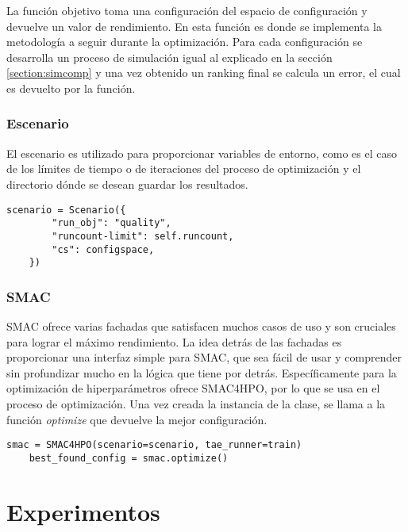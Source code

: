 La función objetivo toma una configuración del espacio de configuración y devuelve un valor de rendimiento. En esta función es donde se implementa la metodología a seguir durante la optimización. Para cada configuración se desarrolla un proceso de simulación igual al explicado en la sección \ref{section:simcomp} y una vez obtenido un ranking final se calcula un error, el cual es devuelto por la función.

\subsubsection*{Escenario}

El escenario es utilizado para proporcionar variables de entorno, como es el caso de los límites de tiempo o de iteraciones del proceso de optimización y el directorio dónde se desean guardar los resultados.

\begin{lstlisting}[caption= Definición del escenario de optimización, label = code:scenario]
    scenario = Scenario({
        "run_obj": "quality",  
        "runcount-limit": self.runcount,
        "cs": configspace,
    })
\end{lstlisting}

\subsubsection*{SMAC}

SMAC ofrece varias fachadas que satisfacen muchos casos de uso y son cruciales para lograr el máximo rendimiento. La idea detrás de las fachadas es proporcionar una interfaz simple para SMAC, que sea fácil de usar y comprender sin profundizar mucho en la lógica que tiene por detrás. Específicamente para la optimización de hiperparámetros ofrece SMAC4HPO, por lo que se usa en el proceso de optimización. Una vez creada la instancia de la clase, se llama a la función \textit{optimize} que devuelve la mejor configuración.

\begin{lstlisting}[caption= Instancia de la clase SMAC4HPO, label = code:smac]
    smac = SMAC4HPO(scenario=scenario, tae_runner=train)
    best_found_config = smac.optimize()
\end{lstlisting}

\section{Experimentos}

